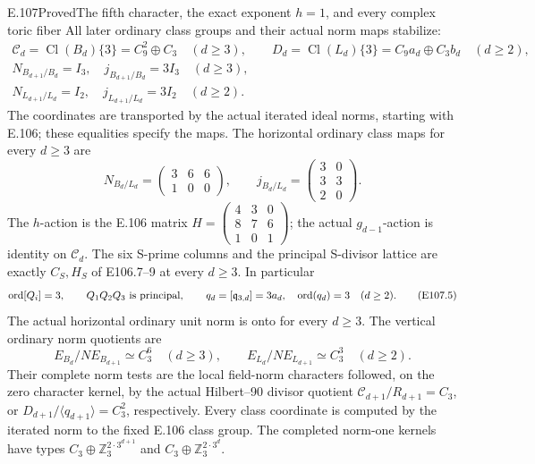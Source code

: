 \begin{statement}{E.107}{Proved}{The fifth character, the exact exponent \(h=1\), and every complex toric fiber}
All later ordinary class groups and their actual norm maps stabilize:
\[
 \begin{gathered}
 \mathcal C_d=\operatorname{Cl}(B_d)\{3\}=C_9^2\oplus C_3
       \quad(d\ge3),\qquad
 D_d=\operatorname{Cl}(L_d)\{3\}=C_9a_d\oplus C_3b_d
       \quad(d\ge2),\\
 N_{B_{d+1}/B_d}=I_3,\quad j_{B_{d+1}/B_d}=3I_3
       \quad(d\ge3),\\
 N_{L_{d+1}/L_d}=I_2,\quad j_{L_{d+1}/L_d}=3I_2
       \quad(d\ge2).
 \end{gathered}
 \tag{E107.3}
\]
The coordinates are transported by the actual iterated ideal norms,
starting with E.106; these equalities specify the maps. The horizontal
ordinary class maps for every \(d\ge3\) are
\[
 N_{B_d/L_d}=
 \begin{pmatrix}3&6&6\\1&0&0\end{pmatrix},\qquad
 j_{B_d/L_d}=
 \begin{pmatrix}3&0\\3&3\\2&0\end{pmatrix}.
 \tag{E107.4}
\]
The \(h\)-action is the E.106 matrix
\(H=\left(\begin{smallmatrix}4&3&0\\8&7&6\\1&0&1\end{smallmatrix}\right)\);
the actual \(g_{d-1}\)-action is identity on \(\mathcal C_d\).
The six S-prime columns and the principal S-divisor lattice are
exactly \(C_S,H_S\) of E106.7--9 at every \(d\ge3\).
In particular
\[
 \operatorname{ord}[Q_i]=3,\qquad
 Q_1Q_2Q_3\ \hbox{is principal},\qquad
 q_d=[\mathfrak q_{3,d}]=3a_d,\quad
 \operatorname{ord}(q_d)=3\quad(d\ge2).
 \tag{E107.5}
\]
The actual horizontal ordinary unit norm is onto for every \(d\ge3\).
The vertical ordinary norm quotients are
\[
 E_{B_d}/N E_{B_{d+1}}\simeq C_3^6\quad(d\ge3),\qquad
 E_{L_d}/N E_{L_{d+1}}\simeq C_3^3\quad(d\ge2).
 \tag{E107.6}
\]
Their complete norm tests are the local field-norm characters followed,
on the zero character kernel, by the actual Hilbert--90 divisor quotient
\(\mathcal C_{d+1}/R_{d+1}=C_3\), or
\(D_{d+1}/\langle q_{d+1}\rangle=C_3^2\), respectively.
Every class coordinate is computed by the iterated norm to the fixed
E.106 class group. The completed norm-one kernels have types
\(C_3\oplus\mathbb Z_3^{2\cdot3^{d+1}}\) and
\(C_3\oplus\mathbb Z_3^{2\cdot3^d}\).


\end{statement}
